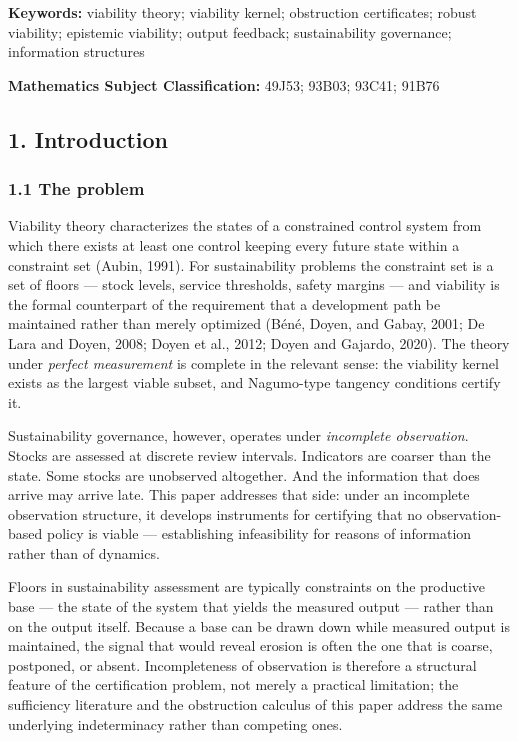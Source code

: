 \documentclass[11pt]{article}
\theoremstyle{definition}
\begin{document}
\textbf{Keywords:} viability theory; viability kernel; obstruction
certificates; robust viability; epistemic viability; output feedback;
sustainability governance; information structures

\textbf{Mathematics Subject Classification:} 49J53; 93B03; 93C41; 91B76

\subsection{1. Introduction}\label{introduction}

\subsubsection{1.1 The problem}\label{the-problem}

Viability theory characterizes the states of a constrained control
system from which there exists at least one control keeping every future
state within a constraint set (Aubin, 1991). For sustainability problems
the constraint set is a set of floors --- stock levels, service
thresholds, safety margins --- and viability is the formal counterpart
of the requirement that a development path be maintained rather than
merely optimized (B\'en\'e, Doyen, and Gabay, 2001; De Lara and Doyen, 2008;
Doyen et al., 2012; Doyen and Gajardo, 2020). The theory under
\emph{perfect measurement} is complete in the relevant sense: the
viability kernel exists as the largest viable subset, and Nagumo-type
tangency conditions certify it.

Sustainability governance, however, operates under \emph{incomplete
observation}. Stocks are assessed at discrete review intervals.
Indicators are coarser than the state. Some stocks are unobserved
altogether. And the information that does arrive may arrive late. This paper addresses that side: under an incomplete observation structure, it develops instruments for certifying that no
observation-based policy is viable --- establishing infeasibility for
reasons of information rather than of dynamics.

Floors in sustainability assessment are typically constraints on the
productive base --- the state of the system that yields the measured
output --- rather than on the output itself. Because a base can be drawn
down while measured output is maintained, the signal that would reveal
erosion is often the one that is coarse, postponed, or absent.
Incompleteness of observation is therefore a structural feature of the
certification problem, not merely a practical limitation; the
sufficiency literature and the obstruction calculus of this paper
address the same underlying indeterminacy rather than competing ones.
\end{document}

